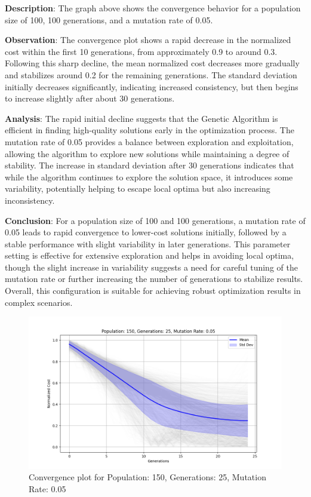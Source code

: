\documentclass[
]{article}
\begin{document}
    \textbf{Description}: The graph above shows the convergence behavior for a population size of 100, 100 generations, and a mutation rate of 0.05.

    \textbf{Observation}: The convergence plot shows a rapid decrease in the normalized cost within the first 10 generations, from approximately 0.9 to around 0.3. Following this sharp decline, the mean normalized cost decreases more gradually and stabilizes around 0.2 for the remaining generations. The standard deviation initially decreases significantly, indicating increased consistency, but then begins to increase slightly after about 30 generations.

    \textbf{Analysis}: The rapid initial decline suggests that the Genetic Algorithm is efficient in finding high-quality solutions early in the optimization process. The mutation rate of 0.05 provides a balance between exploration and exploitation, allowing the algorithm to explore new solutions while maintaining a degree of stability. The increase in standard deviation after 30 generations indicates that while the algorithm continues to explore the solution space, it introduces some variability, potentially helping to escape local optima but also increasing inconsistency.

    \textbf{Conclusion}: For a population size of 100 and 100 generations, a mutation rate of 0.05 leads to rapid convergence to lower-cost solutions initially, followed by a stable performance with slight variability in later generations. This parameter setting is effective for extensive exploration and helps in avoiding local optima, though the slight increase in variability suggests a need for careful tuning of the mutation rate or further increasing the number of generations to stabilize results. Overall, this configuration is suitable for achieving robust optimization results in complex scenarios.

    \begin{figure}[H]
        \centering
        \includegraphics[width=\textwidth]{genetic_algorithm/Population_150_Generations_25_MutationRate_0.05}
        \caption{Convergence plot for Population: 150, Generations: 25, Mutation Rate: 0.05}
        \label{fig:ga_150_25_05}
    \end{figure}
\end{document}
